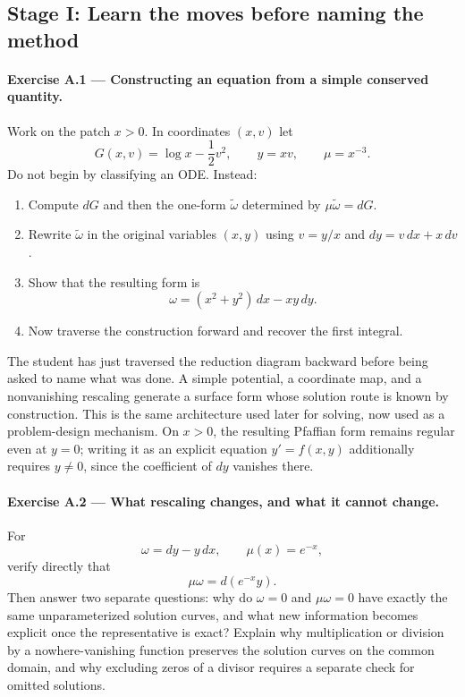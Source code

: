 \documentclass[11pt]{article}
\theoremstyle{definition}
\begin{document}
\subsection{Stage I: Learn the moves before naming the method}

\paragraph{Exercise A.1 --- Constructing an equation from a simple conserved quantity.}
Work on the patch $x>0$. In coordinates $(x,v)$ let
\[
G(x,v)=\log x-\frac12v^2,
\qquad y=xv,
\qquad \mu=x^{-3}.
\]
Do not begin by classifying an ODE. Instead:
\begin{enumerate}[label=(\alph*)]
  \item Compute $dG$ and then the one-form $\widetilde\omega$ determined by $\mu\widetilde\omega=dG$.
  \item Rewrite $\widetilde\omega$ in the original variables $(x,y)$ using $v=y/x$ and $dy=v\,dx+x\,dv$.
  \item Show that the resulting form is
  \[
  \omega=(x^2+y^2)\,dx-xy\,dy.
  \]
  \item Now traverse the construction forward and recover the first integral.
\end{enumerate}

\begin{architectnote}[title={Structural note: backward traversal}]
The student has just traversed the reduction diagram backward before being asked to name what was done. A simple potential, a coordinate map, and a nonvanishing rescaling generate a surface form whose solution route is known by construction. This is the same architecture used later for solving, now used as a problem-design mechanism. On \(x>0\), the resulting Pfaffian form remains regular even at \(y=0\); writing it as an explicit equation \(y'=f(x,y)\) additionally requires \(y\neq0\), since the coefficient of \(dy\) vanishes there.
\end{architectnote}

\paragraph{Exercise A.2 --- What rescaling changes, and what it cannot change.}
For
\[
\omega=dy-y\,dx,
\qquad \mu(x)=e^{-x},
\]
verify directly that
\[
\mu\omega=d(e^{-x}y).
\]
Then answer two separate questions: why do $\omega=0$ and $\mu\omega=0$ have exactly the same unparameterized solution curves, and what new information becomes explicit once the representative is exact? Explain why multiplication or division by a nowhere-vanishing function preserves the solution curves on the common domain, and why excluding zeros of a divisor requires a separate check for omitted solutions.
\end{document}
